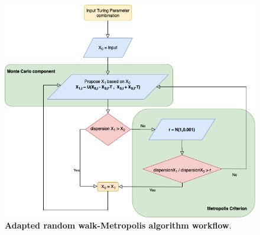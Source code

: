 \begin{figure}[H]
    \centering
    \includegraphics[width=1\textwidth]{chapters/Methods/Simulated Annealing}
    \caption{\textbf{Adapted random walk-Metropolis algorithm workflow}.  }
    \label{Simulated Annealing}
\end{figure}

